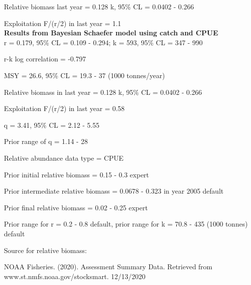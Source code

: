 \documentclass[12pt,a4paper]{article}\usepackage[]{graphicx}\usepackage[]{xcolor}
\begin{document}
Relative biomass last year = 0.128 k, 95\% CL = 0.0402 - 0.266

Exploitation F/(r/2) in last year = 1.1 \\

\textbf{Results from Bayesian Schaefer model using catch and CPUE}\\

r = 0.179, 95\% CL = 0.109 - 0.294; k = 593, 95\% CL = 347 - 990

r-k log correlation = -0.797

MSY = 26.6, 95\% CL = 19.3 - 37 (1000 tonnes/year)

Relative biomass in last year = 0.128 k, 95\% CL = 0.0402 - 0.266

Exploitation F/(r/2) in last year = 0.58

q = 3.41, 95\% CL = 2.12 - 5.55

Prior range of q = 1.14 - 28

Relative abundance data type = CPUE

Prior initial relative biomass = 0.15 - 0.3 expert

Prior intermediate relative biomass = 0.0678 - 0.323 in year 2005 default

Prior final relative biomass = 0.02 - 0.25 expert

Prior range for r = 0.2 - 0.8 default, prior range for k = 70.8 - 435 (1000 tonnes) default

Source for relative biomass: 

NOAA Fisheries. (2020). Assessment Summary Data. Retrieved from www.st.nmfs.noaa.gov/stocksmart. 12/13/2020

    
\end{document}
